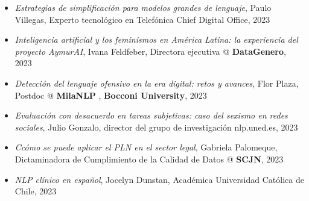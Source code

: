 \begin{itemize}
    \item \textit{Estrategias de simplificación para modelos grandes de lenguaje}, Paulo Villegas, Experto tecnológico en Telefónica Chief Digital Office, 2023
    \item \textit{Inteligencia artificial y los feminismos en América Latina: la experiencia del proyecto AymurAI}, Ivana Feldfeber, Directora ejecutiva @ \textbf{DataGenero}, 2023
    \item \textit{Detección del lenguaje ofensivo en la era digital: retos y avances}, Flor Plaza, Postdoc @ \textbf{MilaNLP} , \textbf{Bocconi University}, 2023
    \item \textit{Evaluación con desacuerdo en tareas subjetivas: caso del sexismo en redes sociales}, Julio Gonzalo, director del grupo de investigación nlp.uned.es, 2023
    \item \textit{Ccómo se puede aplicar el PLN en el sector legal}, Gabriela Palomeque, Dictaminadora de Cumplimiento de la Calidad de Datos @ \textbf{SCJN}, 2023
    \item \textit{NLP clínico en español}, Jocelyn Dunstan, Académica Universidad Católica de Chile, 2023
\end{itemize}